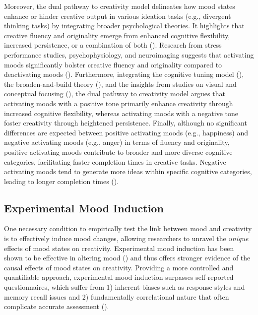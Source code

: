 \documentclass[../MA_Thesis.tex]{subfiles}
\begin{document}
Moreover, the dual pathway to creativity model delineates how mood states enhance or hinder creative output in various ideation tasks (e.g., divergent thinking tasks) by integrating broader psychological theories. It highlights that creative fluency and originality emerge from enhanced cognitive flexibility, increased persistence, or a combination of both (\cite{nijstad_dual_2010}). Research from stress performance studies, psychophysiology, and neuroimaging suggests that activating moods significantly bolster creative fluency and originality compared to deactivating moods (\cite{de_dreu_hedonic_2008}). Furthermore, integrating the cognitive tuning model (\cite{schwarz_happy_1991}), the broaden-and-build theory (\cite{fredrickson_role_2001}), and the insights from studies on visual and conceptual focusing (\cite{derryberry_hemispheric_1989}), the dual pathway to creativity model argues that activating moods with a positive tone primarily enhance creativity through increased cognitive flexibility, whereas activating moods with a negative tone foster creativity through heightened persistence. Finally, although no significant differences are expected between positive activating moods (e.g., happiness) and negative activating moods (e.g., anger) in terms of fluency and originality, positive activating moods contribute to broader and more diverse cognitive categories, facilitating faster completion times in creative tasks. Negative activating moods tend to generate more ideas within specific cognitive categories, leading to longer completion times (\cite{de_dreu_hedonic_2008}).


\subsection*{Experimental Mood Induction}
One necessary condition to empirically test the link between mood and creativity is to effectively induce mood changes, allowing researchers to unravel the \textit{unique} effects of mood states on creativity. Experimental mood induction has been shown to be effective in altering mood (\cite{westermann_relative_1996}) and thus offers stronger evidence of the causal effects of mood states on creativity. Providing a more controlled and quantifiable approach, experimental mood induction surpasses self-reported questionnaires, which suffer from 1) inherent biases such as response styles and memory recall issues and 2) fundamentally correlational nature that often complicate accurate assessment (\cite{soubelet_influence_2011}).
\end{document}
